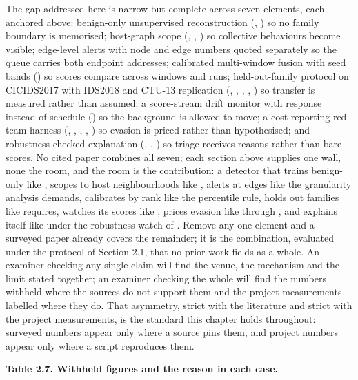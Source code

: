 The gap addressed here is narrow but complete across seven elements, each anchored above: benign-only unsupervised reconstruction (\cite{k10}, \cite{k11}) so no family boundary is memorised; host-graph scope (\cite{k14}, \cite{k16}, \cite{k17}) so collective behaviours become visible; edge-level alerts with node and edge numbers quoted separately so the queue carries both endpoint addresses; calibrated multi-window fusion with seed bands (\cite{k4}) so scores compare across windows and runs; held-out-family protocol on CICIDS2017 with IDS2018 and CTU-13 replication (\cite{k5}, \cite{k6}, \cite{k7}, \cite{k8}, \cite{k23}) so transfer is measured rather than assumed; a score-stream drift monitor with response instead of schedule (\cite{k28}) so the background is allowed to move; a cost-reporting red-team harness (\cite{k25}, \cite{k26}, \cite{k27}, \cite{k32}, \cite{k33}) so evasion is priced rather than hypothesised; and robustness-checked explanation (\cite{k29}, \cite{k36}, \cite{k37}) so triage receives reasons rather than bare scores. No cited paper combines all seven; each section above supplies one wall, none the room, and the room is the contribution: a detector that trains benign-only like \cite{k10}, scopes to host neighbourhoods like \cite{k14}, alerts at edges like the granularity analysis demands, calibrates by rank like the percentile rule, holds out families like \cite{k4} requires, watches its scores like \cite{k28}, prices evasion like \cite{k25} through \cite{k27}, and explains itself like \cite{k36} under the robustness watch of \cite{k37}. Remove any one element and a surveyed paper already covers the remainder; it is the combination, evaluated under the protocol of Section 2.1, that no prior work fields as a whole. An examiner checking any single claim will find the venue, the mechanism and the limit stated together; an examiner checking the whole will find the numbers withheld where the sources do not support them and the project measurements labelled where they do. That asymmetry, strict with the literature and strict with the project measurements, is the standard this chapter holds throughout: surveyed numbers appear only where a source pins them, and project numbers appear only where a script reproduces them.

\begin{center}\textbf{Table 2.7. Withheld figures and the reason in each case.}\end{center}

